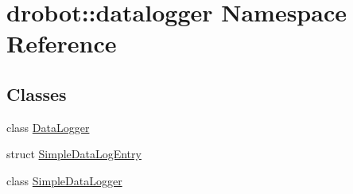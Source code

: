 \hypertarget{namespacedrobot_1_1datalogger}{\section{drobot\-:\-:datalogger Namespace Reference}
\label{namespacedrobot_1_1datalogger}
}
\subsection*{Classes}
\begin{DoxyCompactItemize}
\item 
class \hyperlink{classdrobot_1_1datalogger_1_1DataLogger}{Data\-Logger}
\item 
struct \hyperlink{structdrobot_1_1datalogger_1_1SimpleDataLogEntry}{Simple\-Data\-Log\-Entry}
\item 
class \hyperlink{classdrobot_1_1datalogger_1_1SimpleDataLogger}{Simple\-Data\-Logger}
\end{DoxyCompactItemize}
